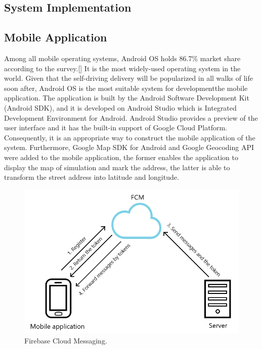 \documentclass[12pt]{ksthesis}
\begin{document}
\begin{thesis}
{  



\chapter{System Implementation}\label{Chap:System_Implementation}

\section{Mobile Application}


Among all mobile operating systems, Android OS holds 86.7\% market share according to the survey.[] It is the most widely-used operating system in the world. Given that the self-driving delivery will be popularized in all walks of life soon after, Android OS is the most suitable system for developmentthe mobile application. The application is built by the Android Software Development Kit (Android SDK), and it is developed on Android Studio which is Integrated Development Environment for Android. Android Studio provides a preview of the user interface and it has the built-in support of Google Cloud Platform. Consequently, it is an appropriate way to construct the mobile application of the system. Furthermore, Google Map SDK for Android and Google Geocoding API were added to the mobile application, the former enables the application to display the map of simulation and mark the address, the latter is able to transform the street address into latitude and longitude.

\begin{figure}[H]
\centering
\includegraphics[width=1.0\textwidth]{./figures/F4-1_FCM.PNG}
\caption{\large Firebase Cloud Messaging.}
\vspace{0.5cm}
\label{Fig:FCM}
\end{figure}

}
\end{thesis}
\end{document}

